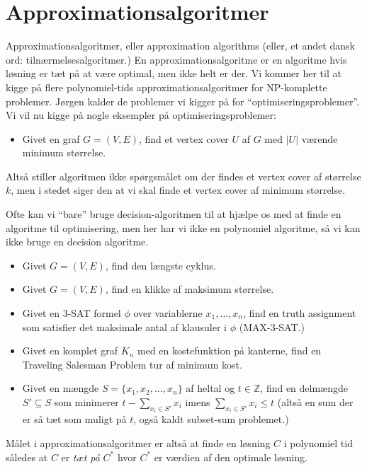 \chapter{Approximationsalgoritmer}

Approximationsalgoritmer, eller approximation algorithms (eller, et andet dansk ord: tilnærmelsesalgoritmer.) En approximationsalgoritme er en algoritme hvis løsning er tæt på at være optimal, men ikke helt er der. Vi kommer her til at kigge på flere polynomiel-tids approximationsalgoritmer for NP-komplette problemer. Jørgen kalder de problemer vi kigger på for ``optimiseringsproblemer''. Vi vil nu kigge på nogle eksempler på optimiseringsproblemer:

\begin{itemize}
  \item Givet en graf $G = (V, E)$, find et vertex cover $U$ af $G$ med $|U|$ værende minimum størrelse.
\end{itemize}

Altså stiller algoritmen ikke spørgsmålet om der findes et  vertex cover af størrelse $k$, men i stedet siger den at vi skal finde et vertex cover af minimum størrelse.

Ofte kan vi ``bare'' bruge decision-algoritmen til at hjælpe os med at finde en algoritme til optimisering, men her har vi ikke en polynomiel algoritme, så vi kan ikke bruge en decision algoritme.

\begin{itemize}
  \item Givet $G = (V,E)$, find den længste cyklus.
  \item Givet $G = (V,E)$, find en klikke af maksimum størrelse.
  \item Givet en 3-SAT formel $\phi$ over variablerne $x_{1}, \ldots, x_{n}$, find en truth assignment som satisfier det maksimale antal af klausuler i $\phi$ (MAX-3-SAT.)
  \item Givet en komplet graf $K_{n}$ med en kostefunktion på kanterne, find en Traveling Salesman Problem tur af minimum kost.
  \item Givet en mængde $S = \{x_{1}, x_{2}, \ldots, x_{n}\}$ af heltal og $t \in \mathbb{Z}$, find en delmængde $S' \subseteq S$ som minimerer $t - \sum_{x_{i} \in S'}x_{i}$ imens $\sum_{x_{i} \in S'} x_{i} \le t$ (altså en sum der er så tæt som muligt på $t$, også kaldt subset-sum problemet.)
\end{itemize}

Målet i approximationsalgoritmer er altså at finde en løsning $C$ i polynomiel tid således at $C$ er \textit{tæt på} $C^*$ hvor $C^{*}$ er værdien af den optimale løsning.

